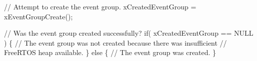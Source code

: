 \begin{DoxyPre}   // Attempt to create the event group.
   xCreatedEventGroup = xEventGroupCreate();\end{DoxyPre}



\begin{DoxyPre}   // Was the event group created successfully?
   if( xCreatedEventGroup == NULL )
   \{
    // The event group was not created because there was insufficient
    // FreeRTOS heap available.
   \}
   else
   \{
    // The event group was created.
   \}
  \end{DoxyPre}
 
